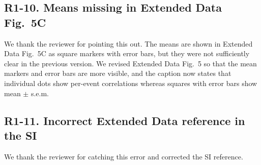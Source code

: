\subsection*{R1-10. Means missing in Extended Data Fig.~5C}


\responselabel
We thank the reviewer for pointing this out. The means are shown in Extended Data Fig.~5C as square markers with error bars, but they were not sufficiently clear in the previous version. We revised Extended Data Fig.~5 so that the mean markers and error bars are more visible, and the caption now states that individual dots show per-event correlations whereas squares with error bars show mean $\pm$ s.e.m.


\subsection*{R1-11. Incorrect Extended Data reference in the SI}


\responselabel
We thank the reviewer for catching this error and corrected the SI reference.
